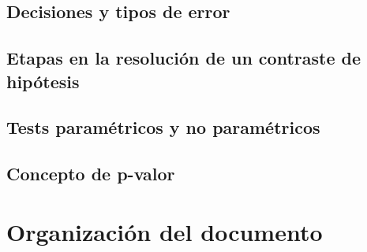 \subsection{Decisiones y tipos de error}
\subsection{Etapas en la resolución de un contraste de hipótesis}
\subsection{Tests paramétricos y no paramétricos}
\subsection{Concepto de p-valor}
\section{Organización del documento}